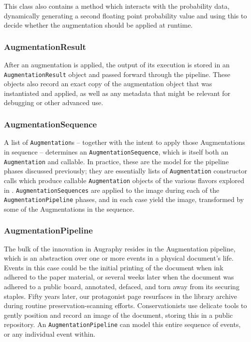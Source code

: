 \documentclass[runningheads]{llncs}
\begin{document}
This class also contains a method which interacts with the probability data, dynamically generating a second floating point probability value and using this to decide whether the augmentation should be applied at runtime.

\subsubsection{AugmentationResult}
After an augmentation is applied, the output of its execution is stored in an \texttt{AugmentationResult} object and passed forward through the pipeline. These objects also record an exact copy of the augmentation object that was instantiated and applied, as well as any metadata that might be relevant for debugging or other advanced use.

\subsubsection{AugmentationSequence}
A list of \texttt{Augmentation}s -- together with the intent to apply those Augmentations in sequence -- determines an \texttt{AugmentationSequence}, which is itself both an \texttt{Augmentation} and callable. In practice, these are the model for the pipeline phases discussed previously; they are essentially lists of \texttt{Augmentation} constructor calls which produce callable \texttt{Augmentation} objects of the various flavors explored in . \texttt{AugmentationSequences} are applied to the image during each of the \texttt{AugmentationPipeline} phases, and in each case yield the image, transformed by some of the Augmentations in the sequence.

\subsubsection{AugmentationPipeline}
The bulk of the innovation in Augraphy resides in the Augmentation pipeline, which is an abstraction over one or more events in a physical document's life. Events in this case could be the initial printing of the document when ink adhered to the paper material, or several weeks later when the document was adhered to a public board, annotated, defaced, and torn away from its securing staples. Fifty years later, our protagonist page resurfaces in the library archive during routine preservation-scanning efforts. Conservationists use delicate tools to gently position and record an image of the document, storing this in a public repository. An \texttt{AugmentationPipeline} can model this entire sequence of events, or any individual event within.\\
\end{document}
